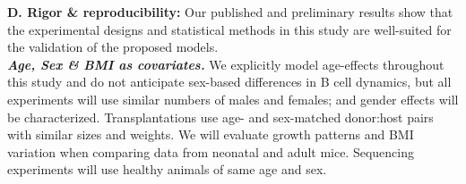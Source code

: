 \documentclass[11pt]{article}
\begin{document}
\vspace{1mm}
\textbf{D. Rigor \& reproducibility:}
Our published and preliminary results show that the experimental designs and statistical methods in this study are well-suited for the validation of the proposed models. \\ %
\textbf{\textit{Age, Sex \& BMI as covariates.}}
We explicitly model age-effects throughout this study and do not anticipate sex-based differences in B cell dynamics, but all experiments will use similar numbers of males and females; and gender effects will be characterized.
Transplantations use age- and sex-matched donor:host pairs with similar sizes and weights.
We will evaluate growth patterns and BMI variation when comparing data from neonatal and adult mice. 
Sequencing experiments will use healthy animals of same age and sex.
%
%






%
%
\end{document}
